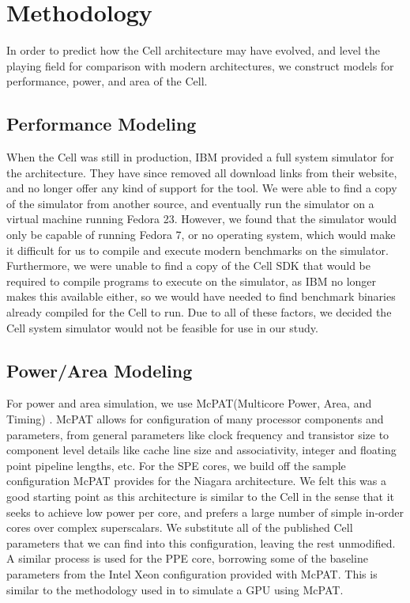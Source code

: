\documentclass{sig-alternate-05-2015}
\begin{document}
\section{Methodology}

In order to predict how the Cell architecture may have evolved, and level the playing field for comparison with modern architectures, we construct models for performance, power, and area of the Cell.

\subsection{Performance Modeling}
When the Cell was still in production, IBM provided a full system simulator for the architecture. They have since removed all download links from their website, and no longer offer any kind of support for the tool. We were able to find a copy of the simulator from another source, and eventually run the simulator on a virtual machine running Fedora 23. However, we found that the simulator would only be capable of running Fedora 7, or no operating system, which would make it difficult for us to compile and execute modern benchmarks on the simulator. Furthermore, we were unable to find a copy of the Cell SDK that would be required to compile programs to execute on the simulator, as IBM no longer makes this available either, so we would have needed to find benchmark binaries already compiled for the Cell to run. Due to all of these factors, we decided the Cell system simulator would not be feasible for use in our study.

\subsection{Power/Area Modeling}

For power and area simulation, we use McPAT(Multicore Power, Area, and Timing) \cite{li2009mcpat}. McPAT allows for configuration of many processor components and parameters, from general parameters like clock frequency and transistor size to component level details like cache line size and associativity, integer and floating point pipeline lengths, etc. For the SPE cores, we build off the sample configuration McPAT provides for the Niagara architecture. We felt this was a good starting point as this architecture is similar to the Cell in the sense that it seeks to achieve low power per core, and prefers a large number of simple in-order cores over complex superscalars. We substitute all of the published Cell parameters that we can find into this configuration, leaving the rest unmodified. A similar process is used for the PPE core, borrowing some of the baseline parameters from the Intel Xeon configuration provided with McPAT. This is similar to the methodology used in \cite{pham2005design} to simulate a GPU using McPAT.
\end{document}
